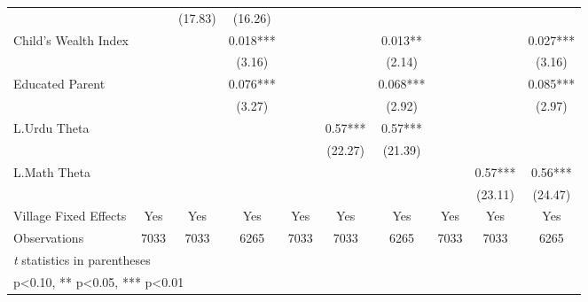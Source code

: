 \begin{sidewaystable}[htbp]
\begin{tabular}{l*{9}{c}}
                &            &  (17.83)   &  (16.26)   &            &            &            &            &            &            \\
Child's Wealth Index&            &            &    0.018***&            &            &    0.013** &            &            &    0.027***\\
                &            &            &   (3.16)   &            &            &   (2.14)   &            &            &   (3.16)   \\
Educated Parent &            &            &    0.076***&            &            &    0.068***&            &            &    0.085***\\
                &            &            &   (3.27)   &            &            &   (2.92)   &            &            &   (2.97)   \\
L.Urdu Theta    &            &            &            &            &     0.57***&     0.57***&            &            &            \\
                &            &            &            &            &  (22.27)   &  (21.39)   &            &            &            \\
L.Math Theta    &            &            &            &            &            &            &            &     0.57***&     0.56***\\
                &            &            &            &            &            &            &            &  (23.11)   &  (24.47)   \\
Village Fixed Effects&      Yes   &      Yes   &      Yes   &      Yes   &      Yes   &      Yes   &      Yes   &      Yes   &      Yes   \\
\midrule
Observations    &     7033   &     7033   &     6265   &     7033   &     7033   &     6265   &     7033   &     7033   &     6265   \\
\bottomrule
\multicolumn{10}{l}{\footnotesize \textit{t} statistics in parentheses}\\
\multicolumn{10}{l}{\footnotesize * p<0.10, ** p<0.05, *** p<0.01}\\
\end{tabular}
\end{sidewaystable}
